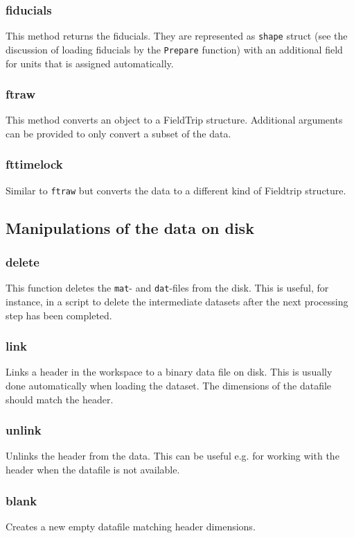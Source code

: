 \subsubsection{fiducials}
This method returns the fiducials. They are represented as \texttt{shape} struct (see the discussion of loading fiducials by the \texttt{Prepare} function) with an additional field for units that is assigned automatically.

\subsubsection{ftraw}
This method converts an object to a FieldTrip structure. Additional arguments can be provided to only convert a subset of the data.

\subsubsection{fttimelock}
Similar to \texttt{ftraw} but converts the data to a different kind of Fieldtrip structure. 

\subsection{Manipulations of the data on  disk}

\subsubsection{delete}
This function deletes the \texttt{mat}- and \texttt{dat}-files from the disk. This is useful, for instance, in a script to delete the intermediate datasets after the next processing step has been completed. 

\subsubsection{link}
Links a header in the workspace to a binary data file on disk. This is usually done automatically when loading the dataset. The dimensions of the datafile should match the header.

\subsubsection{unlink}
Unlinks the header from the data. This can be useful e.g. for working with the header when the datafile is not available.

\subsubsection{blank}
Creates a new empty datafile matching header dimensions.

